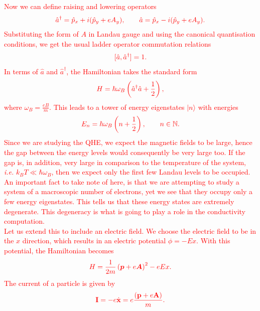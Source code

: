  \textcolor{red}{Now we can define raising and lowering operators }
\begin{align}
    \textcolor{red}{\hat{a}^{\dagger}= \hat{p}_x +i (\hat{p}_y +e A_y), \qquad \hat{a}= \hat{p}_x  -i (\hat{p}_y +e A_y).}
\end{align}
 \textcolor{red}{Substituting the form of $A$ in Landau gauge and using the canonical quanti\textcolor{red}{s}ation conditions, we get the usual ladder operator commutation relations}
\begin{align}
    \textcolor{red}{ [\hat{a}, \hat{a}^{\dagger}] =1.}
\end{align}
\textcolor{red}{In terms of $\hat{a}$ and $\hat{a}^{\dagger}$, the Hamiltonian takes the standard form}
\begin{align}
    \textcolor{red}{ H = \hbar \omega_B \left( \hat{a}^{\dagger} \hat{a}+ \frac{1}{2}\right),}
\end{align}
\textcolor{red}{ where $\omega_B=\frac{eB}{m}$. This leads to a tower of energy eigenstates $|n\rangle$ with energies}
\begin{align}
    \textcolor{red}{ E_n= \hbar \omega_B \left( n + \frac{1}{2} \right), \qquad n \in \mathbb{N}.}
\end{align}
 \textcolor{red}{ Since we are studying the QHE, we expect the magnetic fields to be large, hence the gap between the energy levels would consequently be very large too. If the gap is, in addition, very large in comparison to the temperature of the system, \textit{i.e.} $k_B T \ll \hbar \omega_B$, then we expect only the first few Landau levels to be occupied. An important fact to take note of here, is that we are attempting to study a system of a macroscopic number of electrons, yet we see that they occupy only a few energy eigenstates. This tells us that these energy states are extremely degenerate. This degeneracy is what is going to play a role in the conductivity computation.}\\
 \indent \textcolor{red}{ Let us extend this to include an electric field. We choose the electric field to be in the $x$ direction, which results in an electric potential $\phi = -Ex$. With this potential, the Hamiltonian becomes}
\begin{align}
    \textcolor{red}{ H=\frac{1}{2m}\left(\bm{p} +e \bm{A} \right)^2 -e Ex.}
\end{align}
 \textcolor{red}{ The current of a particle is given by}
\begin{align}
    \textcolor{red}{ {\bf{I}}=-e\dot{{\bf x}}=  e \frac{\left({\bf p}+e{\bf A}\right)}{m}.}
\end{align}
